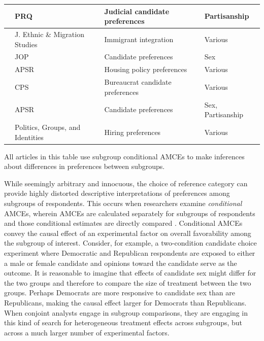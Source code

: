 \documentclass[a4paper,12pt]{article}\usepackage[]{graphicx}\usepackage[]{color}
\begin{document}
\begin{table}
\begin{center}
\begin{tabular}{p{1.5in} p{1.5in} p{1.5in} p{1.5in}}
\citet{Sen2017} & PRQ & Judicial candidate preferences & Partisanship \\ \midrule
\citet{Sobolewskaetal2017} & J. Ethnic \& Migration Studies & Immigrant integration & Various \\ \midrule
\citet{EggersVivyanWagner2018} & JOP & Candidate preferences & Sex \\ \midrule
\citet{Hankinson2018} & APSR & Housing policy preferences & Various \\ \midrule
\citet{OliverosSchuster2018} & CPS & Bureaucrat candidate preferences & Various \\ \midrule
\citet{TeeleKallaRosenbluth2018} & APSR & Candidate preferences & Sex, Partisanship \\ \midrule
\citet{Careyetal2018} & Politics, Groups, and Identities & Hiring preferences & Various \\ \midrule
\bottomrule
\end{tabular}
\end{center}

All articles in this table use subgroup conditional AMCEs to make inferences about differences in preferences between subgroups.
\end{table}

While seemingly arbitrary and innocuous, the choice of reference category can provide highly distorted descriptive interpretations of preferences among subgroups of respondents. This occurs when researchers examine \textit{conditional} AMCEs, wherein AMCEs are calculated separately for subgroups of respondents and those conditional estimates are directly compared \citep[13]{HainmuellerHopkinsYamamoto2014}. Conditional AMCEs convey the causal effect of an experimental factor on overall favorability among the subgroup of interest. Consider, for example, a two-condition candidate choice experiment where Democratic and Republican respondents are exposed to either a male or female candidate and opinions toward the candidate serve as the outcome. It is reasonable to imagine that effects of candidate sex might differ for the two groups and therefore to compare the size of treatment between the two groups. Perhaps Democrats are more responsive to candidate sex than are Republicans, making the causal effect larger for Democrats than Republicans. When conjoint analysts engage in subgroup comparisons, they are engaging in this kind of search for heterogeneous treatment effects across subgroups, but across a much larger number of experimental factors.
\end{document}
